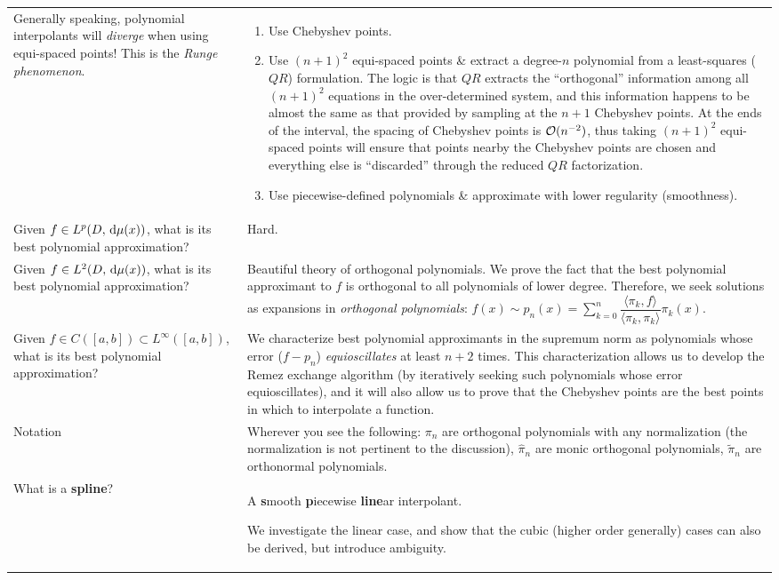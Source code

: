 \documentclass[11pt,letterpaper]{article}
\begin{document}
\begin{longtable}{p{}|p{}}
Generally speaking, polynomial interpolants will {\em diverge} when using equi-spaced points! This is the {\em Runge phenomenon}. & \vspace*{-.7cm}\begin{enumerate} \item Use Chebyshev points. \item Use $(n+1)^2$ equi-spaced points \& extract a degree-$n$ polynomial from a least-squares ($QR$) formulation. The logic is that $QR$ extracts the ``orthogonal'' information among all $(n+1)^2$ equations in the over-determined system, and this information happens to be almost the same as that provided by sampling at the $n+1$ Chebyshev points. At the ends of the interval, the spacing of Chebyshev points is $\mathcal{O}(n^{-2})$, thus taking $(n+1)^2$ equi-spaced points will ensure that points nearby the Chebyshev points are chosen and everything else is ``discarded'' through the reduced $QR$ factorization. \item Use piecewise-defined polynomials \& approximate with lower regularity (smoothness).\end{enumerate}\\

Given $f\in L^p(D,{\rm\,d}\mu(x))$, what is its best polynomial approximation? & Hard.\\

Given $f\in L^2(D,{\rm\,d}\mu(x))$, what is its best polynomial approximation? & Beautiful theory of orthogonal polynomials. We prove the fact that the best polynomial approximant to $f$ is orthogonal to all polynomials of lower degree. Therefore, we seek solutions as expansions in {\em orthogonal polynomials}: $\displaystyle f(x) \sim p_n(x) = \sum_{k=0}^n \dfrac{\langle \pi_k, f\rangle}{\langle \pi_k,\pi_k\rangle}\pi_k(x)$.\\

Given $f\in C([a,b])\subset L^\infty([a,b])$, what is its best polynomial approximation? & We characterize best polynomial approximants in the supremum norm as polynomials whose error ($f-p_n$) {\em equioscillates} at least $n+2$ times. This characterization allows us to develop the Remez exchange algorithm (by iteratively seeking such polynomials whose error equioscillates), and it will also allow us to prove that the Chebyshev points are the best points in which to interpolate a function.\\

Notation & Wherever you see the following: $\pi_n$ are orthogonal polynomials with any normalization (the normalization is not pertinent to the discussion), $\hat{\pi}_n$ are monic orthogonal polynomials, $\tilde{\pi}_n$ are orthonormal polynomials.\\

What is a {\bf spline}? & A {\bf s}mooth {\bf p}iecewise {\bf line}ar interpolant.

We investigate the linear case, and show that the cubic (higher order generally) cases can also be derived, but introduce ambiguity.\\
\hline
\end{longtable}
\end{document}
